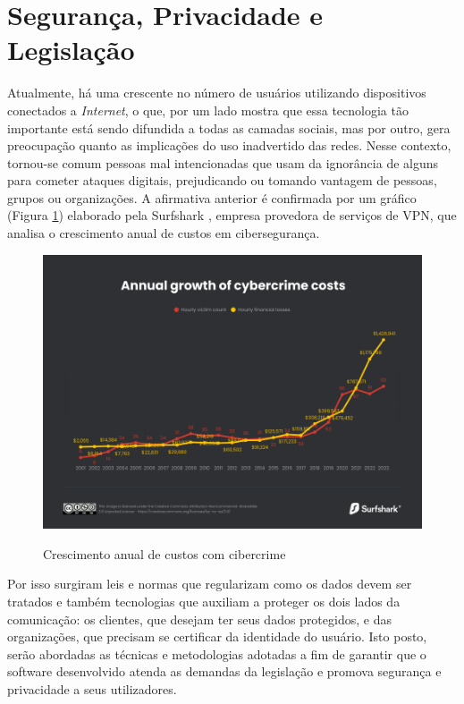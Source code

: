 \section{Segurança, Privacidade e Legislação}
Atualmente, há uma crescente no número de usuários utilizando dispositivos conectados a \textit{Internet}, o que, por um lado mostra que essa tecnologia tão importante está sendo difundida a todas as camadas sociais, mas por outro, gera preocupação quanto as implicações do uso inadvertido das redes.
Nesse contexto, tornou-se comum pessoas mal intencionadas que usam da ignorância de alguns para cometer ataques digitais, prejudicando ou tomando vantagem de pessoas, grupos ou organizações. A afirmativa anterior é confirmada por um gráfico (Figura \ref{fig:cibercrimes}) elaborado pela Surfshark \cite{Surfshark}, empresa provedora de serviços de VPN, que analisa o crescimento anual de custos em cibersegurança. 
\begin{figure}[h]
	\centering
	\caption{Crescimento anual de custos com cibercrime}
	\includegraphics[width=1\textwidth]{cap04-desenvolvimento/images/4-6-annual-growth-of-cybercrime-costs.png}
	\label{fig:cibercrimes}
\end{figure}

Por isso surgiram leis e normas que regularizam como os dados devem ser tratados e também tecnologias que auxiliam a proteger os dois lados da comunicação: os clientes, que desejam ter seus dados protegidos, e das organizações, que precisam se certificar da identidade do usuário.
Isto posto, serão abordadas as técnicas e metodologias adotadas a fim de garantir que o software desenvolvido atenda as demandas da legislação e promova segurança e privacidade a seus utilizadores.

